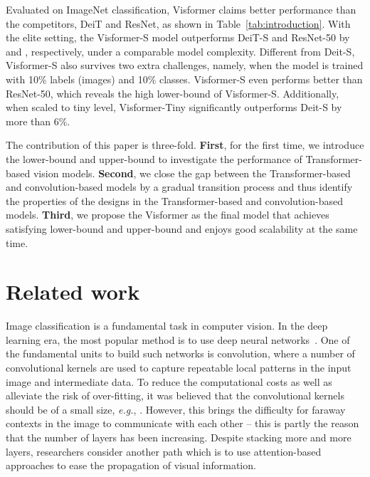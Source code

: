 \documentclass[10pt,twocolumn,letterpaper]{article}
\begin{document}
Evaluated on ImageNet classification, Visformer claims better performance than the competitors, DeiT and ResNet, as shown in Table~\ref{tab:introduction}. With the elite setting, the Visformer-S model outperforms DeiT-S and ResNet-50 by  and , respectively, under a comparable model complexity. Different from Deit-S, Visformer-S also survives two extra challenges, namely, when the model is trained with 10\% labels (images) and 10\% classes. Visformer-S even performs better than ResNet-50, which reveals the high lower-bound of Visformer-S. Additionally,  when scaled to tiny level, Visformer-Tiny significantly outperforms Deit-S by more than 6\%.



The contribution of this paper is three-fold. \textbf{First}, for the first time, we introduce the lower-bound and upper-bound to investigate the performance of Transformer-based vision models. \textbf{Second}, we close the gap between the Transformer-based and convolution-based models by a gradual transition process and thus identify the properties of the designs in the Transformer-based and convolution-based models. \textbf{Third}, we propose the Visformer as the final model that achieves satisfying lower-bound and upper-bound and enjoys good scalability at the same time.

\section{Related work}

Image classification is a fundamental task in computer vision. In the deep learning era, the most popular method is to use deep neural networks~\cite{krizhevsky2012imagenet,simonyan2014very,he2016deep}. One of the fundamental units to build such networks is convolution, where a number of convolutional kernels are used to capture repeatable local patterns in the input image and intermediate data. To reduce the computational costs as well as alleviate the risk of over-fitting, it was believed that the convolutional kernels should be of a small size, \textit{e.g.}, . However, this brings the difficulty for faraway contexts in the image to communicate with each other -- this is partly the reason that the number of layers has been increasing. Despite stacking more and more layers, researchers consider another path which is to use attention-based approaches to ease the propagation of visual information.
\end{document}
